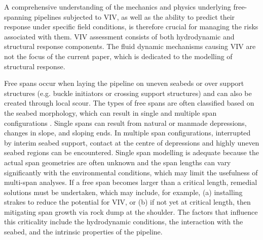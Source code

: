 \documentclass[3p,doublespacing,authoryear,11pt]{elsarticle} %
\begin{document}
A comprehensive understanding of the mechanics and physics underlying free-spanning pipelines subjected to VIV, as well as the ability to predict their response under specific field conditions, is therefore crucial for managing the risks associated with them. VIV assessment consists of both hydrodynamic and structural response components. The fluid dynamic mechanisms causing VIV are not the focus of the current paper, which is dedicated to the modelling of structural response. 

Free spans occur when laying the pipeline on uneven seabeds or over support structures (e.g. buckle initiators or crossing support structures) and can also be created through local scour. The types of free spans are often classified based on the seabed morphology, which can result in single and multiple span configurations \citep{OTI93613}. Single spans can result from natural or manmade depressions, changes in slope, and sloping ends. In multiple span configurations, interrupted by interim seabed support, contact at the centre of depressions and highly uneven seabed regions can be encountered. Single span modelling is adequate because the actual span geometries are often unknown and the span lengths can vary significantly with the environmental conditions, which may limit the usefulness of multi-span analyses. If a free span becomes larger than a critical length, remedial solutions must be undertaken, which may include, for example, (a) installing strakes to reduce the potential for VIV, or (b) if not yet at critical length, then mitigating span growth via rock dump at the shoulder. The factors that influence this criticality include the hydrodynamic conditions, the interaction with the seabed, and the intrinsic properties of the pipeline. 
 
\end{document}
